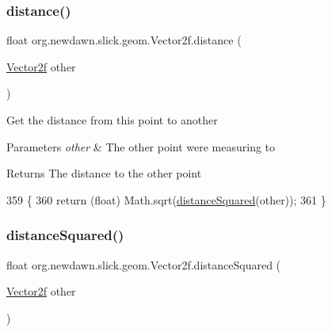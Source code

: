 \subsubsection{\texorpdfstring{distance()}{distance()}}
{\footnotesize\ttfamily float org.\+newdawn.\+slick.\+geom.\+Vector2f.\+distance (\begin{DoxyParamCaption}\item[{\mbox{\hyperlink{classorg_1_1newdawn_1_1slick_1_1geom_1_1_vector2f}{Vector2f}}}]{other }\end{DoxyParamCaption})\hspace{0.3cm}{\ttfamily [inline]}}

Get the distance from this point to another


\begin{DoxyParams}{Parameters}
{\em other} & The other point we\textquotesingle{}re measuring to \\
\hline
\end{DoxyParams}
\begin{DoxyReturn}{Returns}
The distance to the other point 
\end{DoxyReturn}

\begin{DoxyCode}
359                                           \{
360         \textcolor{keywordflow}{return} (\textcolor{keywordtype}{float}) Math.sqrt(\mbox{\hyperlink{classorg_1_1newdawn_1_1slick_1_1geom_1_1_vector2f_a1c97567a2a84307f2022327c80d6d124}{distanceSquared}}(other));
361     \}
\end{DoxyCode}
\mbox{\label{classorg_1_1newdawn_1_1slick_1_1geom_1_1_vector2f_a1c97567a2a84307f2022327c80d6d124}} 
\subsubsection{\texorpdfstring{distance\+Squared()}{distanceSquared()}}
{\footnotesize\ttfamily float org.\+newdawn.\+slick.\+geom.\+Vector2f.\+distance\+Squared (\begin{DoxyParamCaption}\item[{\mbox{\hyperlink{classorg_1_1newdawn_1_1slick_1_1geom_1_1_vector2f}{Vector2f}}}]{other }\end{DoxyParamCaption})\hspace{0.3cm}{\ttfamily [inline]}}

